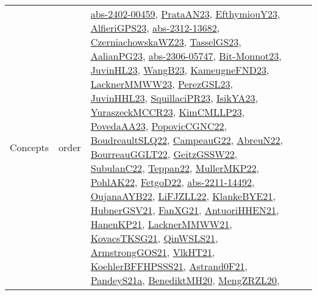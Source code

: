 {\begin{longtable}{lp{3cm}>{\raggedright}p{6cm}>{\raggedright}p{6cm}p{8cm}}
Concepts & order & \href{articles/abs-2402-00459.pdf}{abs-2402-00459}\cite{abs-2402-00459}, \href{articles/PrataAN23.pdf}{PrataAN23}\cite{PrataAN23}, \href{papers/EfthymiouY23.pdf}{EfthymiouY23}\cite{EfthymiouY23}, \href{articles/AlfieriGPS23.pdf}{AlfieriGPS23}\cite{AlfieriGPS23}, \href{articles/abs-2312-13682.pdf}{abs-2312-13682}\cite{abs-2312-13682}, \href{articles/CzerniachowskaWZ23.pdf}{CzerniachowskaWZ23}\cite{CzerniachowskaWZ23}, \href{papers/TasselGS23.pdf}{TasselGS23}\cite{TasselGS23}, \href{papers/AalianPG23.pdf}{AalianPG23}\cite{AalianPG23}, \href{articles/abs-2306-05747.pdf}{abs-2306-05747}\cite{abs-2306-05747}, \href{papers/Bit-Monnot23.pdf}{Bit-Monnot23}\cite{Bit-Monnot23}, \href{papers/JuvinHL23.pdf}{JuvinHL23}\cite{JuvinHL23}, \href{papers/WangB23.pdf}{WangB23}\cite{WangB23}, \href{papers/KameugneFND23.pdf}{KameugneFND23}\cite{KameugneFND23}, \href{articles/LacknerMMWW23.pdf}{LacknerMMWW23}\cite{LacknerMMWW23}, \href{papers/PerezGSL23.pdf}{PerezGSL23}\cite{PerezGSL23}, \href{papers/JuvinHHL23.pdf}{JuvinHHL23}\cite{JuvinHHL23}, \href{papers/SquillaciPR23.pdf}{SquillaciPR23}\cite{SquillaciPR23}, \href{articles/IsikYA23.pdf}{IsikYA23}\cite{IsikYA23}, \href{articles/YuraszeckMCCR23.pdf}{YuraszeckMCCR23}\cite{YuraszeckMCCR23}, \href{papers/KimCMLLP23.pdf}{KimCMLLP23}\cite{KimCMLLP23}, \href{papers/PovedaAA23.pdf}{PovedaAA23}\cite{PovedaAA23}, \href{papers/PopovicCGNC22.pdf}{PopovicCGNC22}\cite{PopovicCGNC22}, \href{papers/BoudreaultSLQ22.pdf}{BoudreaultSLQ22}\cite{BoudreaultSLQ22}, \href{articles/CampeauG22.pdf}{CampeauG22}\cite{CampeauG22}, \href{articles/AbreuN22.pdf}{AbreuN22}\cite{AbreuN22}, \href{articles/BourreauGGLT22.pdf}{BourreauGGLT22}\cite{BourreauGGLT22}, \href{papers/GeitzGSSW22.pdf}{GeitzGSSW22}\cite{GeitzGSSW22}, \href{articles/SubulanC22.pdf}{SubulanC22}\cite{SubulanC22}, \href{papers/Teppan22.pdf}{Teppan22}\cite{Teppan22}, \href{articles/MullerMKP22.pdf}{MullerMKP22}\cite{MullerMKP22}, \href{articles/PohlAK22.pdf}{PohlAK22}\cite{PohlAK22}, \href{articles/FetgoD22.pdf}{FetgoD22}\cite{FetgoD22}, \href{articles/abs-2211-14492.pdf}{abs-2211-14492}\cite{abs-2211-14492}, \href{papers/OujanaAYB22.pdf}{OujanaAYB22}\cite{OujanaAYB22}, \href{papers/LiFJZLL22.pdf}{LiFJZLL22}\cite{LiFJZLL22}, \href{papers/KlankeBYE21.pdf}{KlankeBYE21}\cite{KlankeBYE21}, \href{articles/HubnerGSV21.pdf}{HubnerGSV21}\cite{HubnerGSV21}, \href{articles/FanXG21.pdf}{FanXG21}\cite{FanXG21}, \href{papers/AntuoriHHEN21.pdf}{AntuoriHHEN21}\cite{AntuoriHHEN21}, \href{papers/HanenKP21.pdf}{HanenKP21}\cite{HanenKP21}, \href{papers/LacknerMMWW21.pdf}{LacknerMMWW21}\cite{LacknerMMWW21}, \href{papers/KovacsTKSG21.pdf}{KovacsTKSG21}\cite{KovacsTKSG21}, \href{articles/QinWSLS21.pdf}{QinWSLS21}\cite{QinWSLS21}, \href{papers/ArmstrongGOS21.pdf}{ArmstrongGOS21}\cite{ArmstrongGOS21}, \href{articles/VlkHT21.pdf}{VlkHT21}\cite{VlkHT21}, \href{articles/KoehlerBFFHPSSS21.pdf}{KoehlerBFFHPSSS21}\cite{KoehlerBFFHPSSS21}, \href{papers/Astrand0F21.pdf}{Astrand0F21}\cite{Astrand0F21}, \href{articles/PandeyS21a.pdf}{PandeyS21a}\cite{PandeyS21a}, \href{articles/BenediktMH20.pdf}{BenediktMH20}\cite{BenediktMH20}, \href{articles/MengZRZL20.pdf}{MengZRZL20}\cite{MengZRZL20}, 
\end{longtable}}
